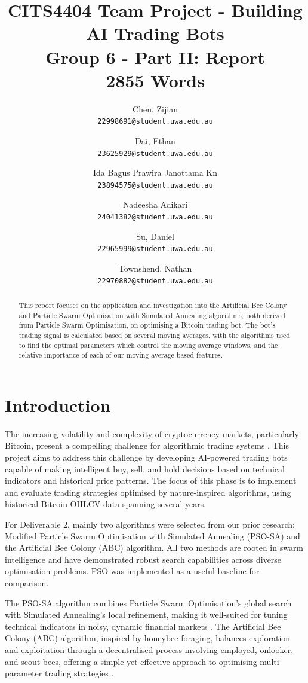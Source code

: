 \documentclass[a4paper, 12pt]{extarticle}
\title{
    CITS4404 Team Project - Building AI Trading Bots
    \\ \large Group 6 - Part II: Report
    \\ 2855 Words
}
\author{
    Chen, Zijian\\
    \normalsize \texttt{22998691@student.uwa.edu.au}
    \and
    Dai, Ethan\\
    \normalsize \texttt{23625929@student.uwa.edu.au}
    \and
    Ida Bagus Prawira Janottama Kn\\
    \normalsize \texttt{23894575@student.uwa.edu.au}
    \and
    Nadeesha Adikari\\
    \normalsize \texttt{24041382@student.uwa.edu.au}
    \and
    Su, Daniel\\
    \normalsize \texttt{22965999@student.uwa.edu.au}
    \and
    Townshend, Nathan\\
    \normalsize \texttt{22970882@student.uwa.edu.au}
}
\date{}
\begin{document}
\maketitle

\begin{abstract}
    \noindent
    This report focuses on the application and investigation into the Artificial Bee Colony and Particle Swarm Optimisation with Simulated Annealing algorithms, both derived from Particle Swarm Optimisation, on optimising a Bitcoin trading bot. The bot's trading signal is calculated based on several moving averages, with the algorithms used to find the optimal parameters which control the moving average windows, and the relative importance of each of our moving average based features.
\end{abstract}

\newpage
\tableofcontents
\newpage

\section{Introduction}
The increasing volatility and complexity of cryptocurrency markets, particularly Bitcoin, present a compelling challenge for algorithmic trading systems \cite{dakalbab2024artificial}. This project aims to address this challenge by developing AI-powered trading bots capable of making intelligent buy, sell, and hold decisions based on technical indicators and historical price patterns. The focus of this phase is to implement and evaluate trading strategies optimised by nature-inspired algorithms, using historical Bitcoin OHLCV data spanning several years. 

For Deliverable 2, mainly two algorithms were selected from our prior research:  Modified Particle Swarm Optimisation with Simulated Annealing (PSO-SA) and the Artificial Bee Colony (ABC) algorithm. All two methods are rooted in swarm intelligence and have demonstrated robust search capabilities across diverse optimisation problems. PSO was implemented as a useful baseline for comparison. 

The PSO-SA algorithm combines Particle Swarm Optimisation's global search with Simulated Annealing's local refinement, making it well-suited for tuning technical indicators in noisy, dynamic financial markets \cite{psosa}. The Artificial Bee Colony (ABC) algorithm, inspired by honeybee foraging, balances exploration and exploitation through a decentralised process involving employed, onlooker, and scout bees, offering a simple yet effective approach to optimising multi-parameter trading strategies \cite{abc}. 
\end{document}
